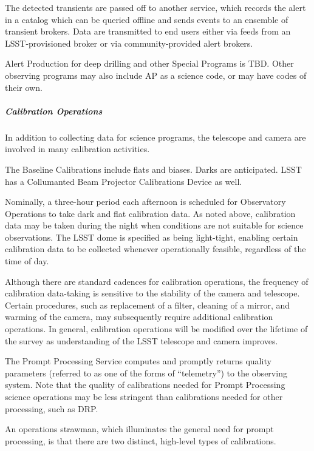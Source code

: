 The detected transients are passed off to another service, which
records the alert in a catalog which can be queried offline and sends
events to an ensemble of transient brokers. Data are transmitted to end
users either via feeds from an LSST-provisioned broker or via
community-provided alert brokers.

Alert Production for deep drilling and other Special Programs is TBD.  
Other observing programs
may also include AP as a science code, or may have codes of their own.

\subparagraph{Calibration Operations}

In addition to collecting data for science programs, the telescope and
camera are involved in many calibration activities. 

The Baseline Calibrations include flats and biases.  Darks are anticipated.  LSST has a Collumanted Beam Projector Calibrations Device as well.  

Nominally, a
three-hour period each afternoon is scheduled for Observatory Operations
to take dark and flat calibration data. As noted above, calibration data
may be taken during the night when conditions are not suitable for
science observations. The LSST dome is specified as being light-tight,
enabling certain calibration data to be collected whenever operationally
feasible, regardless of the time of day.

Although there are standard cadences for calibration operations, the
frequency of calibration data-taking is sensitive to the stability of
the camera and telescope. Certain procedures, such as replacement of a
filter, cleaning of a mirror, and warming of the camera, may
subsequently require additional calibration operations. In general,
calibration operations will be modified over the lifetime of the
survey as understanding of the LSST telescope and camera improves.

The Prompt Processing Service computes and promptly returns quality
parameters (referred to as one of the forms of “telemetry”) to the observing system. Note
that the quality of calibrations needed for Prompt Processing science
operations may be less stringent than calibrations needed for other
processing, such as DRP.

An operations strawman, which illuminates the general need for prompt
processing, is that there are two distinct, high-level types of
calibrations.

